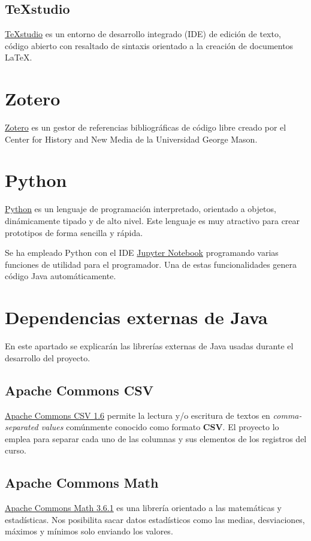 \subsection{TeXstudio}

\href{https://www.texstudio.org/}{TeXstudio} es un entorno de desarrollo integrado (IDE) de edición de texto, código abierto con resaltado de sintaxis orientado a la creación de documentos \LaTeX.

\section{Zotero}
\href{https://www.zotero.org/}{Zotero} es un gestor de referencias bibliográficas de código libre creado por el Center for History and New Media de la Universidad George Mason.

\section{Python}
\href{https://www.python.org/}{Python} es un lenguaje de programación interpretado, orientado a objetos, dinámicamente tipado y de alto nivel. Este lenguaje es muy atractivo para crear prototipos de forma sencilla y rápida. 

Se ha empleado Python con el IDE \href{https://jupyter.org/}{Jupyter Notebook} programando varias funciones de utilidad para el programador. Una de estas funcionalidades genera código Java automáticamente.

\section{Dependencias externas de Java}
En este apartado se explicarán las librerías externas de Java usadas durante el desarrollo del proyecto. 

\subsection{Apache Commons CSV}
\href{https://commons.apache.org/proper/commons-csv/
}{Apache Commons CSV 1.6} permite la lectura y/o escritura de textos en \textit{comma-separated values} comúnmente conocido como formato \textbf{CSV}. 
El proyecto lo emplea para separar cada uno de las columnas y sus elementos de los registros del curso.

\subsection{Apache Commons Math}
\href{https://commons.apache.org/proper/commons-math/}{Apache Commons Math
3.6.1} es una librería orientado a las matemáticas y estadísticas.
Nos posibilita sacar datos estadísticos como las medias, desviaciones, máximos y mínimos solo enviando los valores.

